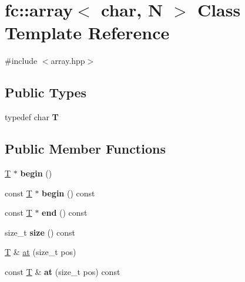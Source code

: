 \hypertarget{classfc_1_1array_3_01char_00_01_n_01_4}{}\section{fc\+:\+:array$<$ char, N $>$ Class Template Reference}
\label{classfc_1_1array_3_01char_00_01_n_01_4}


{\ttfamily \#include $<$array.\+hpp$>$}

\subsection*{Public Types}
\begin{DoxyCompactItemize}
\item 
\mbox{\label{classfc_1_1array_3_01char_00_01_n_01_4_a926bf75183b4f05d284240aec38d12ef}} 
typedef char {\bfseries T}
\end{DoxyCompactItemize}
\subsection*{Public Member Functions}
\begin{DoxyCompactItemize}
\item 
\mbox{\label{classfc_1_1array_3_01char_00_01_n_01_4_a6a09986782e3f92aad2e8e5f442dd29e}} 
\mbox{\hyperlink{struct_t}{T}} $\ast$ {\bfseries begin} ()
\item 
\mbox{\label{classfc_1_1array_3_01char_00_01_n_01_4_a5367b738f82ab0e8c6229647339ef4a6}} 
const \mbox{\hyperlink{struct_t}{T}} $\ast$ {\bfseries begin} () const
\item 
\mbox{\label{classfc_1_1array_3_01char_00_01_n_01_4_a1613eb8f73730f16395b08eb6e8c28c2}} 
const \mbox{\hyperlink{struct_t}{T}} $\ast$ {\bfseries end} () const
\item 
\mbox{\label{classfc_1_1array_3_01char_00_01_n_01_4_a23196b3cec65927af95eb4f4e2e5b86a}} 
size\+\_\+t {\bfseries size} () const
\end{DoxyCompactItemize}
\textbf{ }\par
\begin{DoxyCompactItemize}
\item 
\mbox{\hyperlink{struct_t}{T}} \& \mbox{\hyperlink{classfc_1_1array_3_01char_00_01_n_01_4_a7ce0269b643af65d33b386e6fdf86ddb}{at}} (size\+\_\+t pos)
\item 
\mbox{\label{classfc_1_1array_3_01char_00_01_n_01_4_a0bdc69732a8d8c569a9d4e9938515060}} 
const \mbox{\hyperlink{struct_t}{T}} \& {\bfseries at} (size\+\_\+t pos) const
\end{DoxyCompactItemize}

